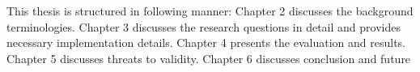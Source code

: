 This thesis is structured in following manner: Chapter 2 discusses the background terminologies. Chapter 3 discusses the research questions in detail and provides necessary implementation details. Chapter 4 presents the evaluation and results. Chapter 5 discusses threats to validity. Chapter 6 discusses conclusion and future

